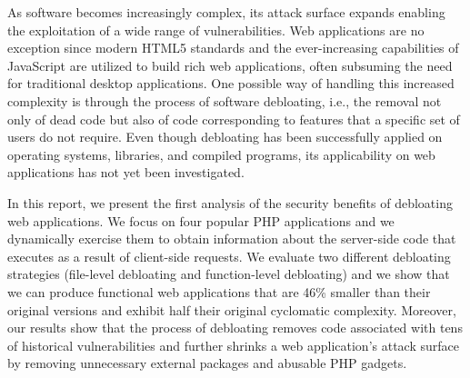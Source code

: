 As software becomes increasingly complex, its attack surface expands enabling
the exploitation of a wide range of vulnerabilities. Web applications are no
exception since modern HTML5 standards and the ever-increasing capabilities
of JavaScript are utilized to build rich web applications, often subsuming
the need for traditional desktop applications. One possible way of handling
this increased complexity is through the process of software debloating, i.e.,
the removal not only of dead code but also of code corresponding to features
that a specific set of users do not require. Even though debloating has been
successfully applied on operating systems, libraries, and compiled programs,
its applicability on web applications has not yet been investigated.

In this report, we present the first analysis of the security benefits of
debloating web applications. We focus on four popular PHP applications and
we dynamically exercise them to obtain information about the server-side code
that executes as a result of client-side requests. We evaluate two different
debloating strategies (file-level debloating and function-level debloating)
and we show that we can produce functional web applications that are 46\%
smaller than their original versions and exhibit half their original cyclomatic
complexity. Moreover, our results show that the process of debloating removes
code associated with tens of historical vulnerabilities and further shrinks
a web application's attack surface by removing unnecessary external packages
and abusable PHP gadgets.
